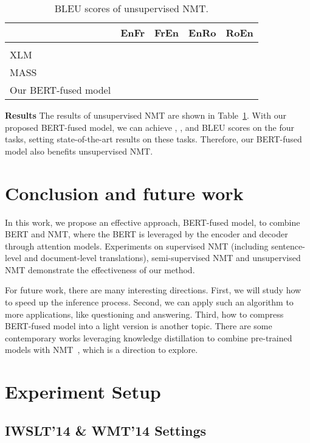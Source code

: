 \documentclass{article} \usepackage{iclr2020_conference,times}
\begin{document}
\begin{table}[!htbp]
\centering
\caption{BLEU scores of unsupervised NMT.}
\begin{tabular}{lcccc}
\toprule
& EnFr & FrEn & EnRo & RoEn \\
\midrule
\citet{lample2018phrase} & && & \\
XLM~\citep{lample2019cross} &  &  &&\\
MASS~\citep{song2019mass} &  &  &  &  \\
Our BERT-fused model&  &   &  & \\
\bottomrule
\end{tabular}
\label{tab:results_unmt}
\end{table}


\noindent\textbf{Results} The results of unsupervised NMT are shown in Table~\ref{tab:results_unmt}.
With our proposed BERT-fused model, we can achieve , ,  and  BLEU scores on the four tasks, setting state-of-the-art results on these tasks. Therefore,  our BERT-fused model also benefits unsupervised NMT. 

\section{Conclusion and future work}\label{sec:conc}
In this work, we propose an effective approach, BERT-fused model, to combine BERT and NMT, where the BERT is leveraged by the encoder and decoder through attention models. Experiments on supervised NMT (including sentence-level and document-level translations), semi-supervised NMT and unsupervised NMT demonstrate the effectiveness of our method. 

For future work, there are many interesting directions. First, we will study how to speed up the inference process. Second, we can apply such an algorithm to more applications, like questioning and answering. Third, how to compress BERT-fused model into a light version is another  topic. There are some contemporary works leveraging knowledge distillation to combine pre-trained models with NMT~\citep{yang2019towards,chen2019distilling}, which is a direction to explore.





\clearpage
\appendix
\section{Experiment Setup}

\subsection{IWSLT'14 \& WMT'14 Settings}\label{sec:iwslt_wmt_data}
\end{document}
